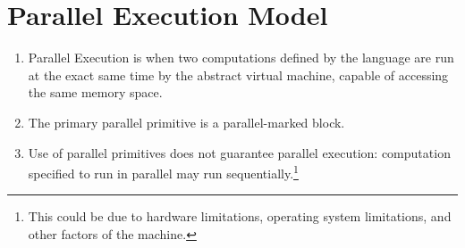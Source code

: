 \section{Parallel Execution Model}

\begin{enumerate}
	\item Parallel Execution is when two computations defined by the language are run at the exact same time by the abstract virtual machine, capable of accessing the same memory space.
	\item The primary parallel primitive is a parallel-marked block.
	\item Use of parallel primitives does not guarantee parallel execution: computation specified to run in parallel may run sequentially.\footnote{This could be due to hardware limitations, operating system limitations, and other factors of the machine.}
\end{enumerate}
